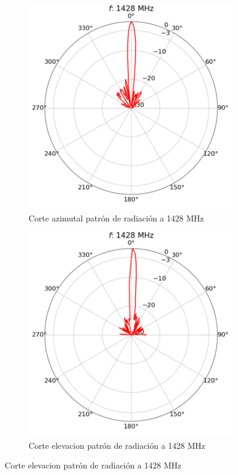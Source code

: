 \begin{figure}[h!]
    \centering
    \begin{subfigure}{0.45\textwidth}
        \includegraphics[width=\textwidth]{img/1420rp}
        \caption{Corte azimutal patrón de radiación a 1428 MHz}
        \label{fig:1420rp}
    \end{subfigure}
    \begin{subfigure}{0.45\textwidth}
        \includegraphics[width=\textwidth]{img/1420rpel}
        \caption{Corte elevacion patrón de radiación a 1428 MHz}
        \label{fig:1420rpel}
    \end{subfigure}
\end{figure}


